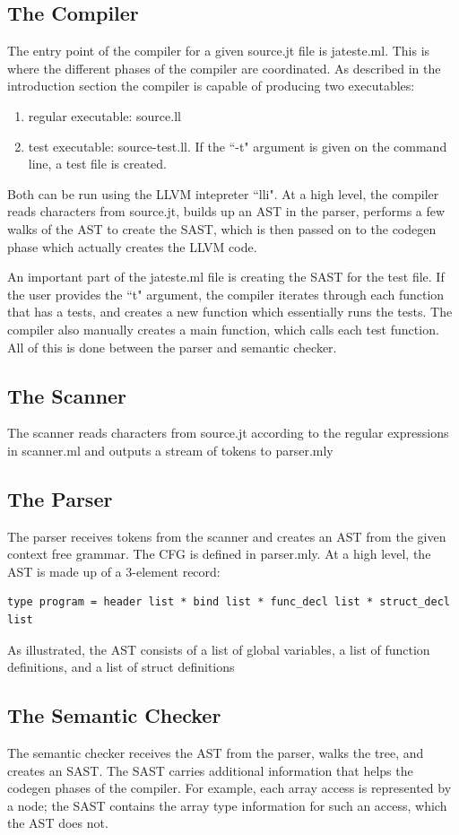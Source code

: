 \documentclass{article}
\begin{document}
\subsection{The Compiler}
The entry point of the compiler for a given source.jt file is jateste.ml. This is where the different phases of the compiler are coordinated. As described in the introduction section the compiler is capable of producing two executables:
\begin{enumerate}
\item regular executable: source.ll
\item test executable: source-test.ll. If the ``-t" argument is given on the command line, a test file is created.
\end{enumerate}
Both can be run using the LLVM intepreter ``lli". At a high level, the compiler reads characters from source.jt, builds up an AST in the parser, performs a few walks of the AST to create the SAST, which is then passed on to the codegen phase which actually creates the LLVM code.
\par
An important part of the jateste.ml file is creating the SAST for the test file. If the user provides the ``t" argument, the compiler iterates through each function that has a tests, and creates a new function which essentially runs the tests. The compiler also manually creates a main function, which calls each test function. All of this is done between the parser and semantic checker. 
\subsection{The Scanner}
The scanner reads characters from source.jt according to the regular expressions in scanner.ml and outputs a stream of tokens to parser.mly
\subsection{The Parser}
The parser receives tokens from the scanner and creates an AST from the given context free grammar. The CFG is defined in parser.mly. At a high level, the AST is made up of a 3-element record: \\
\begin{lstlisting}
type program = header list * bind list * func_decl list * struct_decl list
\end{lstlisting}
As illustrated, the AST consists of a list of global variables, a list of function definitions, and a list of struct definitions
\subsection{The Semantic Checker}
The semantic checker receives the AST from the parser, walks the tree, and creates an SAST. The SAST carries additional information that helps the codegen phases of the compiler. For example, each array access is represented by a node; the SAST contains the array type information for such an access, which the AST does not.
\end{document}
